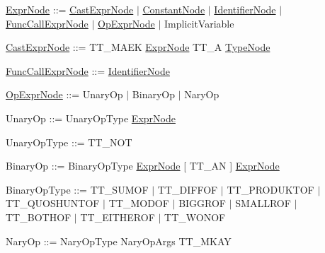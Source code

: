 \begin{DoxyParagraph}{}
\hyperlink{struct_expr_node}{Expr\-Node} \-:\-:= \hyperlink{struct_cast_expr_node}{Cast\-Expr\-Node} $|$ \hyperlink{struct_constant_node}{Constant\-Node} $|$ \hyperlink{struct_identifier_node}{Identifier\-Node} $|$ \hyperlink{struct_func_call_expr_node}{Func\-Call\-Expr\-Node} $|$ \hyperlink{struct_op_expr_node}{Op\-Expr\-Node} $|$ Implicit\-Variable
\end{DoxyParagraph}
\begin{DoxyParagraph}{}
\hyperlink{struct_cast_expr_node}{Cast\-Expr\-Node} \-:\-:= {\ttfamily T\-T\-\_\-\-M\-A\-E\-K} \hyperlink{struct_expr_node}{Expr\-Node} {\ttfamily T\-T\-\_\-\-A} \hyperlink{struct_type_node}{Type\-Node}
\end{DoxyParagraph}
\begin{DoxyParagraph}{}
\hyperlink{struct_func_call_expr_node}{Func\-Call\-Expr\-Node} \-:\-:= \hyperlink{struct_identifier_node}{Identifier\-Node}
\end{DoxyParagraph}
\begin{DoxyParagraph}{}
\hyperlink{struct_op_expr_node}{Op\-Expr\-Node} \-:\-:= Unary\-Op $|$ Binary\-Op $|$ Nary\-Op
\end{DoxyParagraph}
\begin{DoxyParagraph}{}
Unary\-Op \-:\-:= Unary\-Op\-Type \hyperlink{struct_expr_node}{Expr\-Node}
\end{DoxyParagraph}
\begin{DoxyParagraph}{}
Unary\-Op\-Type \-:\-:= {\ttfamily T\-T\-\_\-\-N\-O\-T} 
\end{DoxyParagraph}
\begin{DoxyParagraph}{}
Binary\-Op \-:\-:= Binary\-Op\-Type \hyperlink{struct_expr_node}{Expr\-Node} \mbox{[} {\ttfamily T\-T\-\_\-\-A\-N} \mbox{]} \hyperlink{struct_expr_node}{Expr\-Node}
\end{DoxyParagraph}
\begin{DoxyParagraph}{}
Binary\-Op\-Type \-:\-:= {\ttfamily T\-T\-\_\-\-S\-U\-M\-O\-F} $|$ {\ttfamily T\-T\-\_\-\-D\-I\-F\-F\-O\-F} $|$ {\ttfamily T\-T\-\_\-\-P\-R\-O\-D\-U\-K\-T\-O\-F} $|$ {\ttfamily T\-T\-\_\-\-Q\-U\-O\-S\-H\-U\-N\-T\-O\-F} $|$ {\ttfamily T\-T\-\_\-\-M\-O\-D\-O\-F} $|$ {\ttfamily B\-I\-G\-G\-R\-O\-F} $|$ {\ttfamily S\-M\-A\-L\-L\-R\-O\-F} $|$ {\ttfamily T\-T\-\_\-\-B\-O\-T\-H\-O\-F} $|$ {\ttfamily T\-T\-\_\-\-E\-I\-T\-H\-E\-R\-O\-F} $|$ {\ttfamily T\-T\-\_\-\-W\-O\-N\-O\-F} 
\end{DoxyParagraph}
\begin{DoxyParagraph}{}
Nary\-Op \-:\-:= Nary\-Op\-Type Nary\-Op\-Args {\ttfamily T\-T\-\_\-\-M\-K\-A\-Y} 
\end{DoxyParagraph}
